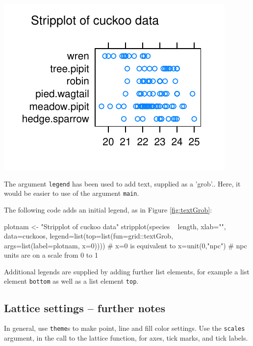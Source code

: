 \documentclass{tufte-book}\usepackage[]{graphicx}\usepackage[]{color}
\newcommand{\txtt}[1]{\texttt{#1}}
\newcommand{\margtt}[1]{{\footnotesize \texttt{#1}}}
\begin{document}
\begin{marginfigure}[-36pt]
\begin{Schunk}


\centerline{\includegraphics[width=\textwidth]{figs/09-strip-grob-1} }

\end{Schunk}
\caption{The argument \margtt{legend} has been used to add text,
  supplied as a 'grob'.\label{fig:textGrob}. Here, it would be
  easier to use of the argument \margtt{main}.}
\end{marginfigure}

The following code adds an initial legend, as in Figure \ref{fig:textGrob}:
\begin{Schunk}
\begin{Sinput}
plotnam <- "Stripplot of cuckoo data"
stripplot(species ~ length, xlab="", data=cuckoos,
  legend=list(top=list(fun=grid::textGrob,
                       args=list(label=plotnam,
                                 x=0))))
# x=0 is equivalent to x=unit(0,"npc")
# npc units are on a scale from 0 to 1
\end{Sinput}
\end{Schunk}
Additional legends are supplied by adding further
  list elements, for example a list element \txtt{bottom} as well as a
  list element \txtt{top}.

\subsection{Lattice settings -- further notes}\label{ss:latticeParam}

In general, use \txtt{theme}s to make point, line and fill color settings.
Use the \txtt{scales} argument, in the call to the lattice function,
for axes, tick marks, and tick labels.
\end{document}
